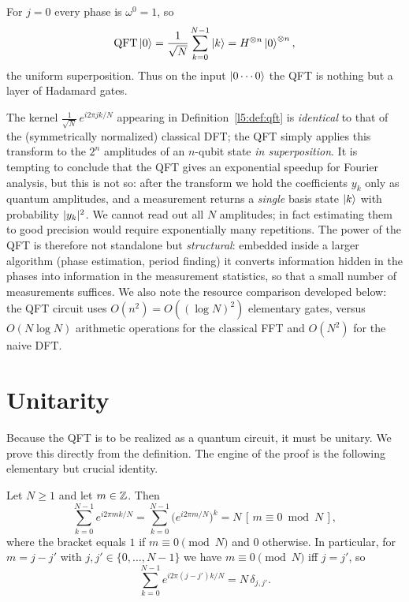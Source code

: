 \begin{example}\label{l5:ex:zero}
For $j=0$ every phase is $\omega^{0}=1$, so
\[
  \mathrm{QFT}\ket{0} = \frac{1}{\sqrt N}\sum_{k=0}^{N-1}\ket{k}
              = H^{\otimes n}\ket{0}^{\otimes n},
\]
the uniform superposition. Thus on the input $\ket{0\cdots 0}$ the QFT is
nothing but a layer of Hadamard gates.
\end{example}

\begin{remark}\label{l5:rem:dft}
The kernel $\tfrac{1}{\sqrt N}\,e^{i2\pi jk/N}$ appearing in
Definition~\ref{l5:def:qft} is \emph{identical} to that of the (symmetrically
normalized) classical DFT; the QFT simply applies this transform to the $2^n$
amplitudes of an $n$-qubit state \emph{in superposition}. It is tempting to
conclude that the QFT gives an exponential speedup for Fourier analysis, but
this is not so: after the transform we hold the coefficients $y_k$ only as
quantum amplitudes, and a measurement returns a \emph{single} basis state
$\ket{k}$ with probability $\lvert y_k\rvert^2$. We cannot read out all $N$ amplitudes;
in fact estimating them to good precision would require exponentially many
repetitions. The power of the QFT is therefore not standalone but
\emph{structural}: embedded inside a larger algorithm (phase estimation,
period finding) it converts information hidden in the phases into information in
the measurement statistics, so that a small number of measurements suffices. We
also note the resource comparison developed below: the QFT circuit uses
$O(n^2) = O((\log N)^2)$ elementary gates, versus $O(N\log N)$ arithmetic
operations for the classical FFT and $O(N^2)$ for the naive DFT.
\end{remark}

\section{Unitarity}

Because the QFT is to be realized as a quantum circuit, it must be unitary. We
prove this directly from the definition. The engine of the proof is the
following elementary but crucial identity.

\begin{lemma}\label{l5:lem:geom}
Let $N\ge 1$ and let $m\in\mathbb{Z}$. Then
\[
  \sum_{k=0}^{N-1} e^{i 2\pi m k / N}
  = \sum_{k=0}^{N-1}\bigl(e^{i2\pi m/N}\bigr)^{k}
  = N\,[\,m\equiv 0 \bmod N\,],
\]
where the bracket equals $1$ if $m\equiv 0 \pmod N$ and $0$ otherwise. In
particular, for $m = j - j'$ with $j,j' \in \{0,\dots,N-1\}$ we have
$m\equiv 0 \pmod N$ iff $j = j'$, so
\[
  \sum_{k=0}^{N-1} e^{i 2\pi (j-j') k / N} = N\,\delta_{j,j'} .
\]
\end{lemma}

